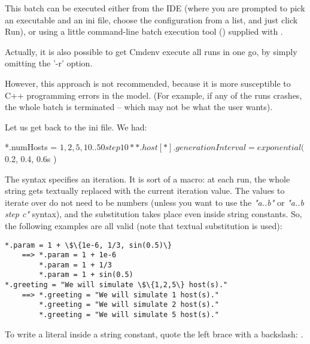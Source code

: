 This batch can be executed either from the {\opp} IDE (where you are
prompted to pick an executable and an ini file, choose the configuration
from a list, and just click Run), or using a little command-line
batch execution tool () supplied with {\opp}.

Actually, it is also possible to get Cmdenv execute all runs in one go,
by simply omitting the '-r' option.




However, this approach is not recommended, because it is more
susceptible to C++ programming errors in the model. (For example, if
any of the runs crashes, the whole batch is terminated -- which may
not be what the user wants).

Let us get back to the ini file. We had:

\begin{inifile}
*.numHosts = ${1, 2, 5, 10..50 step 10}
**.host[*].generationInterval = exponential( ${0.2, 0.4, 0.6}s )
\end{inifile}


The  syntax specifies an iteration. It is sort of a macro: at
each run, the whole  string gets textually replaced with the
current iteration value. The values to iterate over do not need to be
numbers (unless you want to use the \textit{"a..b"} or
\textit{"a..b step c"} syntax), and the
substitution takes place even inside string constants. So, the
following examples are all valid (note that textual substitution is
used):

\begin{Verbatim}[commandchars=\\\{\}]
*.param = 1 + \$\{1e-6, 1/3, sin(0.5)\}
    ==> *.param = 1 + 1e-6
        *.param = 1 + 1/3
        *.param = 1 + sin(0.5)
*.greeting = "We will simulate \$\{1,2,5\} host(s)."
    ==> *.greeting = "We will simulate 1 host(s)."
        *.greeting = "We will simulate 2 host(s)."
        *.greeting = "We will simulate 5 host(s)."
\end{Verbatim}

To write a literal  inside a string constant, quote
the left brace with a backslash: .



